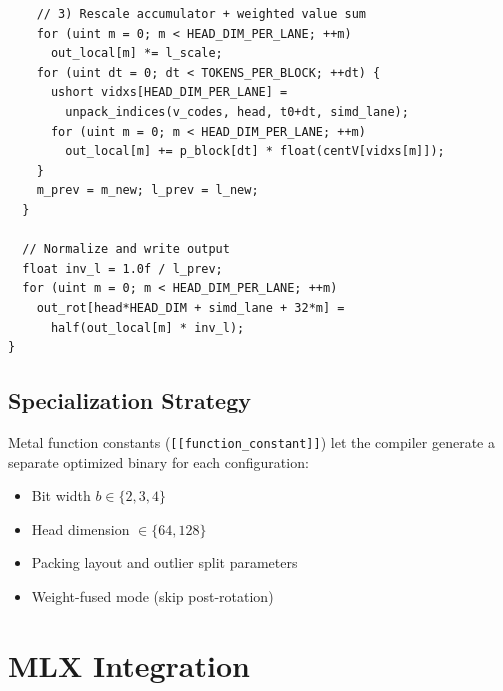 \documentclass[nobib]{tufte-handout}
\begin{document}
\begin{fullwidth}
\begin{lstlisting}
    // 3) Rescale accumulator + weighted value sum
    for (uint m = 0; m < HEAD_DIM_PER_LANE; ++m)
      out_local[m] *= l_scale;
    for (uint dt = 0; dt < TOKENS_PER_BLOCK; ++dt) {
      ushort vidxs[HEAD_DIM_PER_LANE] =
        unpack_indices(v_codes, head, t0+dt, simd_lane);
      for (uint m = 0; m < HEAD_DIM_PER_LANE; ++m)
        out_local[m] += p_block[dt] * float(centV[vidxs[m]]);
    }
    m_prev = m_new; l_prev = l_new;
  }

  // Normalize and write output
  float inv_l = 1.0f / l_prev;
  for (uint m = 0; m < HEAD_DIM_PER_LANE; ++m)
    out_rot[head*HEAD_DIM + simd_lane + 32*m] =
      half(out_local[m] * inv_l);
}
\end{lstlisting}
\end{fullwidth}


\subsection{Specialization Strategy}

Metal function constants (\texttt{[[function\_constant]]}) let the compiler generate a separate optimized binary for each configuration:
\begin{itemize}
  \item Bit width $b \in \{2, 3, 4\}$
  \item Head dimension $\in \{64, 128\}$
  \item Packing layout and outlier split parameters
  \item Weight-fused mode (skip post-rotation)
\end{itemize}


\section{MLX Integration}

\end{document}
